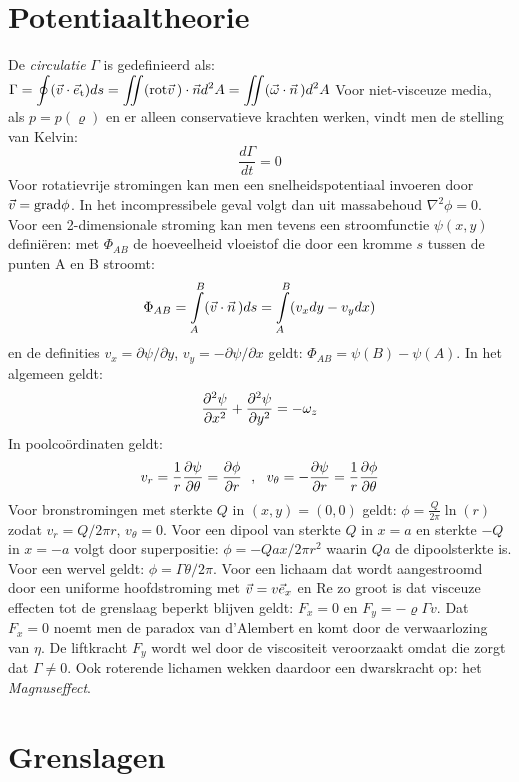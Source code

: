 \documentclass[twoside]{report}
\begin{document}
\section{Potentiaaltheorie}
De {\it circulatie} $\Gamma$ is gedefinieerd als:
$\displaystyle
\Gamma=\oint(\vec{v}\cdot\vec{e}_{\rm t})ds=\int\hspace{-1.5ex}\int({\rm rot}\vec{v}\,)\cdot\vec{n}d^2A=\int\hspace{-1.5ex}\int(\vec{\omega}\cdot\vec{n}\,)d^2A
$
\npar
Voor niet-visceuze media, als $p=p(\varrho)$ en er alleen conservatieve
krachten werken, vindt men de stelling van Kelvin:
\[
\frac{d\Gamma}{dt}=0
\]
Voor rotatievrije stromingen kan men een snelheidspotentiaal invoeren door
$\vec{v}={\rm grad}\phi$. In het incompressibele geval volgt dan uit massabehoud
$\nabla^2\phi=0$. Voor een 2-dimensionale stroming kan men tevens een
stroomfunctie $\psi(x,y)$ defini\"eren: met $\Phi_{AB}$ de hoeveelheid
vloeistof die door een kromme $s$ tussen de punten A en B stroomt:
\[
\Phi_{AB}=\int\limits_A^B (\vec{v}\cdot\vec{n}\,)ds=\int\limits_A^B(v_xdy-v_ydx)
\]
en de definities $v_x=\partial\psi/\partial y$, $v_y=-\partial\psi/\partial x$
geldt: $\Phi_{AB}=\psi(B)-\psi(A)$. In het algemeen geldt:
\[
\frac{\partial^2 \psi}{\partial x^2}+\frac{\partial^2 \psi}{\partial y^2}=-\omega_z
\]
In poolco\"ordinaten geldt:
\[
v_r=\frac{1}{r}\frac{\partial \psi}{\partial \theta}=\frac{\partial \phi}{\partial r}~~,~~
v_\theta=-\frac{\partial \psi}{\partial r}=\frac{1}{r}\frac{\partial \phi}{\partial \theta}
\]
Voor bronstromingen met sterkte $Q$ in $(x,y)=(0,0)$ geldt:
$\displaystyle\phi=\frac{Q}{2\pi}\ln(r)$ zodat $v_r=Q/2\pi r$, $v_\theta=0$.
\npar
Voor een dipool van sterkte $Q$ in $x=a$ en sterkte $-Q$ in $x=-a$ volgt door
superpositie: $\displaystyle\phi=-Qax/2\pi r^2$ waarin $Qa$ de dipoolsterkte
is. Voor een wervel geldt: $\phi=\Gamma\theta/2\pi$.
\npar
Voor een lichaam dat wordt aangestroomd door een uniforme hoofdstroming met
$\vec{v}=v\vec{e}_x$ en Re zo groot is dat visceuze effecten tot de grenslaag
beperkt blijven geldt: $F_x=0$ en $F_y=-\varrho\Gamma v$. Dat $F_x=0$ noemt
men de paradox van d'Alembert en komt door de verwaarlozing van $\eta$. De
liftkracht $F_y$ wordt wel door de viscositeit veroorzaakt omdat die zorgt
dat $\Gamma\neq0$. Ook roterende lichamen wekken daardoor een dwarskracht op:
het {\it Magnuseffect}.

\section{Grenslagen}
\end{document}
